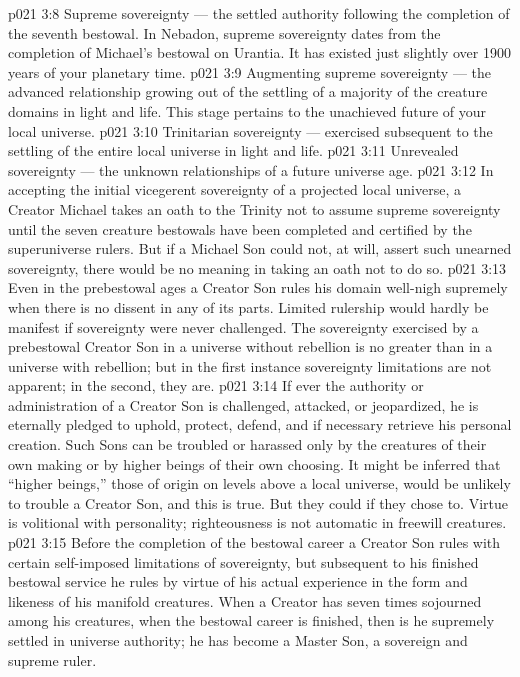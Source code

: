 \vs p021 3:8 \bibnobreakspace Supreme sovereignty --- the settled authority following the completion of the seventh bestowal. In Nebadon, supreme sovereignty dates from the completion of Michael’s bestowal on Urantia. It has existed just slightly over 1900 years of your planetary time.
\vs p021 3:9 \bibnobreakspace Augmenting supreme sovereignty --- the advanced relationship growing out of the settling of a majority of the creature domains in light and life. This stage pertains to the unachieved future of your local universe.
\vs p021 3:10 \bibnobreakspace Trinitarian sovereignty --- exercised subsequent to the settling of the entire local universe in light and life.
\vs p021 3:11 \bibnobreakspace Unrevealed sovereignty --- the unknown relationships of a future universe age.
\vs p021 3:12 \pc In accepting the initial vicegerent sovereignty of a projected local universe, a Creator Michael takes an oath to the Trinity not to assume supreme sovereignty until the seven creature bestowals have been completed and certified by the superuniverse rulers. But if a Michael Son could not, at will, assert such unearned sovereignty, there would be no meaning in taking an oath not to do so.
\vs p021 3:13 Even in the prebestowal ages a Creator Son rules his domain well\hyp{}nigh supremely when there is no dissent in any of its parts. Limited rulership would hardly be manifest if sovereignty were never challenged. The sovereignty exercised by a prebestowal Creator Son in a universe without rebellion is no greater than in a universe with rebellion; but in the first instance sovereignty limitations are not apparent; in the second, they are.
\vs p021 3:14 If ever the authority or administration of a Creator Son is challenged, attacked, or jeopardized, he is eternally pledged to uphold, protect, defend, and if necessary retrieve his personal creation. Such Sons can be troubled or harassed only by the creatures of their own making or by higher beings of their own choosing. It might be inferred that “higher beings,” those of origin on levels above a local universe, would be unlikely to trouble a Creator Son, and this is true. But they could if they chose to. Virtue is volitional with personality; righteousness is not automatic in freewill creatures.
\vs p021 3:15 Before the completion of the bestowal career a Creator Son rules with certain self\hyp{}imposed limitations of sovereignty, but subsequent to his finished bestowal service he rules by virtue of his actual experience in the form and likeness of his manifold creatures. When a Creator has seven times sojourned among his creatures, when the bestowal career is finished, then is he supremely settled in universe authority; he has become a Master Son, a sovereign and supreme ruler.
